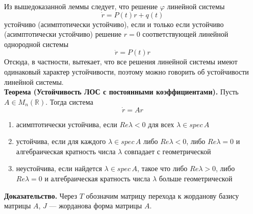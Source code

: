 \documentclass{article}
\begin{document}
Из вышедоказанной леммы следует, что решение $\varphi$ линейной системы
\begin{equation*}
    \dot{r} = P(t)r + q(t)
\end{equation*}
устойчиво (асимптотически устойчиво), если и только если устойчиво (асимптотически устойчиво) решение $r = 0$ соответствующей линейной однородной системы
\begin{equation*}
    \dot{r} = P(t)r
\end{equation*}
Отсюда, в частности, вытекает, что все решения линейной системы имеют одинаковый характер устойчивости, поэтому можно говорить об устойчивости линейной системы.\\

\noindent \textbf{Теорема (Устойчивость ЛОС с постоянными коэффициентами).} Пусть $A \in M_n(\mathbb{R})$. Тогда система
\begin{equation}
    \dot{r} = Ar \label{lodnpost2}
\end{equation}
\begin{enumerate}
    \item асимптотически устойчива, если $Re \lambda < 0$ для всех $\lambda \in spec\, A$
    \item устойчива, если для каждого $\lambda \in spec\, A$ либо $Re\lambda < 0$, либо $Re \lambda = 0$ и алгебраическая кратность числа $\lambda$ совпадает с геометрической
    \item неустойчива, если найдется $\lambda \in spec\, A$, такое что либо $Re \lambda > 0$, либо $Re\lambda = 0$ и алгебраическая кратность числа $\lambda$ больше геометрической
\end{enumerate}
\noindent \textbf{Доказательство.} Через $T$ обозначим матрицу перехода к жорданову базису матрицы $A$, $J$ --- жорданова форма матрицы $A$.
\end{document}

